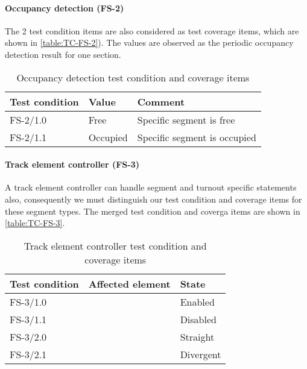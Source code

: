 \paragraph{Occupancy detection (FS-2)}
The 2 test condition items are also considered as test coverage items, which are shown in \autoref{table:TC-FS-2}). The values are observed as the periodic occupancy detection result for one section.
\begin{table}[H]
	\caption{Occupancy detection test condition and coverage items}
	\label{table:TC-FS-2}
	\begin{center}
		\renewcommand{\arraystretch}{1.8}
		\begin{tabu} 
			to 0.9 \textwidth
			{  X[c] X[c] X[c] }
			\toprule
			Test condition & Value    & Comment             \\ \midrule
			FS-2/1.0       & Free     & Specific segment is free     \\
			FS-2/1.1       & Occupied & Specific segment is occupied \\ \bottomrule
		\end{tabu}
	\end{center}
\end{table}


\paragraph{Track element controller (FS-3)}
A track element controller can handle segment and turnout specific statements also, consequently we must distinguish our test condition and coverage items for these segment types. The merged test condition and coverga items are shown in \autoref{table:TC-FS-3}.
\begin{table}[H]
	\caption{Track element controller test condition and coverage items}
	\label{table:TC-FS-3}
	\begin{center}
		\renewcommand{\arraystretch}{1.8}
		\begin{tabu} 
			to 0.9 \textwidth
			{  X[c] X[c] X[c] }
			\toprule
			Test condition & Affected element               & State     \\ \midrule
			FS-3/1.0       &  & Enabled   \\
			FS-3/1.1       &                                & Disabled  \\
			FS-3/2.0       &  & Straight  \\
			FS-3/2.1       &                                & Divergent \\ \bottomrule
		\end{tabu}
	\end{center}
\end{table} 

